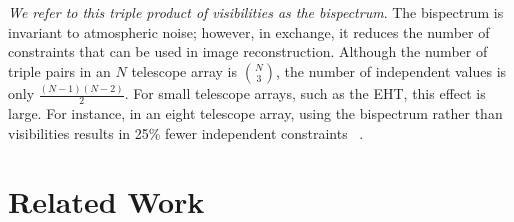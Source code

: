 {{\it We refer to this triple product of visibilities as the bispectrum}. The bispectrum is invariant to atmospheric noise; however, in exchange, it reduces the number of constraints that can be used in image reconstruction. Although the number of triple pairs in an $N$ telescope array is ${N\choose 3}$, the number of independent values is only $\frac{(N-1)(N-2)}{2}$.
For small telescope arrays, such as the EHT, this effect is large. 
For instance, in an eight telescope array, using the bispectrum rather than visibilities results in 25\% fewer independent 
constraints 
~\cite{felli1989very}.




 
\section{Related Work}
\label{sec:related}


 


}
